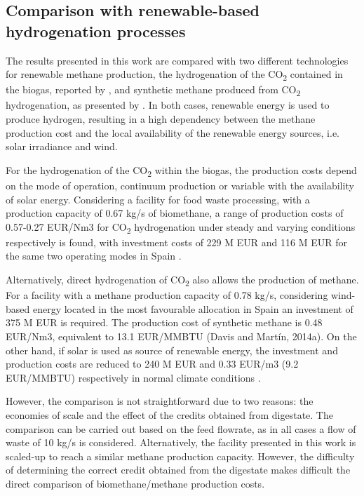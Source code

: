\begin{refsection}[referencesCh7]
\subsection{Comparison with renewable-based hydrogenation processes}
The results presented in this work are compared with two different technologies for renewable methane production, the hydrogenation of the CO\textsubscript{2} contained in the biogas, reported by \citet{curto2019renewable}, and synthetic methane produced from CO\textsubscript{2} hydrogenation, as presented by \citet{davis2014optimala, davis2014optimalb}. In both cases, renewable energy is used to produce hydrogen, resulting in a high dependency between the methane production cost and the local availability of the renewable energy sources, i.e. solar irradiance and wind.

For the hydrogenation of the CO\textsubscript{2} within the biogas, the production costs depend on the mode of operation, continuum production or variable with the availability of solar energy. Considering a facility for food waste processing, with a production capacity of 0.67 kg/s of biomethane, a range of production costs of 0.57-0.27 EUR/Nm3 for CO\textsubscript{2} hydrogenation under steady and varying conditions respectively is found, with investment costs of 229 M EUR and 116 M EUR for the same two operating modes in Spain \citep{curto2019renewable}.

Alternatively, direct hydrogenation of CO\textsubscript{2} also allows the production of methane. For a facility with a methane production capacity of 0.78 kg/s, considering wind-based energy located in the most favourable allocation in Spain an investment of 375 M EUR is required. The production cost of synthetic methane is 0.48 EUR/Nm3, equivalent to 13.1 EUR/MMBTU (Davis and Martín, 2014a). On the other hand, if solar is used as source of renewable energy, the investment and production costs are reduced to 240 M EUR and 0.33 EUR/m3 (9.2 EUR/MMBTU) respectively in normal climate conditions \citet{davis2014optimalb}.

However, the comparison is not straightforward due to two reasons: the economies of scale and the effect of the credits obtained from digestate. The comparison can be carried out based on the feed flowrate, as in all cases a flow of waste of 10 kg/s is considered. Alternatively, the facility presented in this work is scaled-up to reach a similar methane production capacity. However, the difficulty of determining the correct credit obtained from the digestate makes difficult the direct comparison of biomethane/methane production costs.


\end{refsection}

